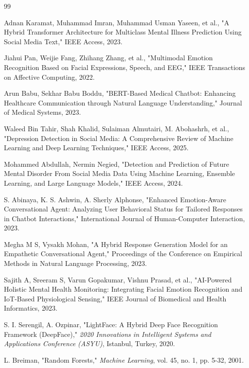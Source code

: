 \documentclass[11pt]{report}
\begin{document}
\begin{thebibliography}{99}

 Adnan Karamat, Muhammad Imran, Muhammad Usman Yaseen, et al., "A Hybrid Transformer Architecture for Multiclass Mental Illness Prediction Using Social Media Text," IEEE Access, 2023.

 Jiahui Pan, Weijie Fang, Zhihang Zhang, et al., "Multimodal Emotion Recognition Based on Facial Expressions, Speech, and EEG," IEEE Transactions on Affective Computing, 2022.

 Arun Babu, Sekhar Babu Boddu, "BERT-Based Medical Chatbot: Enhancing Healthcare Communication through Natural Language Understanding," Journal of Medical Systems, 2023.

 Waleed Bin Tahir, Shah Khalid, Sulaiman Almutairi, M. Abohashrh, et al., "Depression Detection in Social Media: A Comprehensive Review of Machine Learning and Deep Learning Techniques," IEEE Access, 2025.

 Mohammed Abdullah, Nermin Negied, "Detection and Prediction of Future Mental Disorder From Social Media Data Using Machine Learning, Ensemble Learning, and Large Language Models," IEEE Access, 2024.

 S. Abinaya, K. S. Ashwin, A. Sherly Alphonse, "Enhanced Emotion-Aware Conversational Agent: Analyzing User Behavioral Status for Tailored Responses in Chatbot Interactions," International Journal of Human-Computer Interaction, 2023.

 Megha M S, Vysakh Mohan, "A Hybrid Response Generation Model for an Empathetic Conversational Agent," Proceedings of the Conference on Empirical Methods in Natural Language Processing, 2023.

 Sajith A, Sreeram S, Varun Gopakumar, Vishnu Prasad, et al., "AI-Powered Holistic Mental Health Monitoring: Integrating Facial Emotion Recognition and IoT-Based Physiological Sensing," IEEE Journal of Biomedical and Health Informatics, 2023.

 S. I. Serengil, A. Ozpinar, "LightFace: A Hybrid Deep Face Recognition Framework (DeepFace)," \textit{2020 Innovations in Intelligent Systems and Applications Conference (ASYU)}, Istanbul, Turkey, 2020.

 L. Breiman, "Random Forests," \textit{Machine Learning}, vol. 45, no. 1, pp. 5-32, 2001.


\end{thebibliography}
\end{document}

